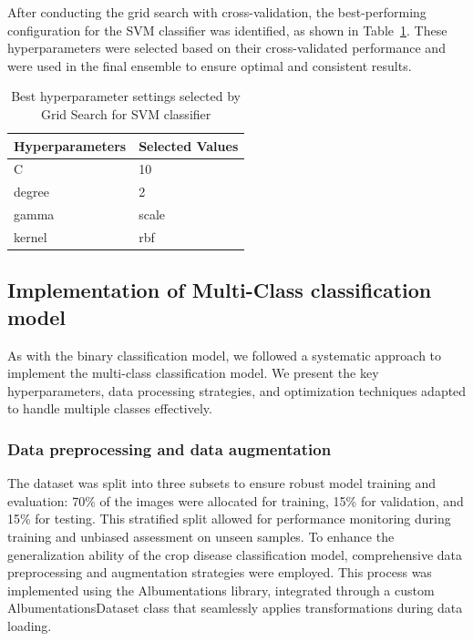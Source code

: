 After conducting the grid search with cross-validation, the best-performing configuration for the SVM classifier was identified, as shown in Table~\ref{tab:svm_best}. These hyperparameters were selected based on their cross-validated performance and were used in the final ensemble to ensure optimal and consistent results.

\begin{table}[h]
\centering
\caption{Best hyperparameter settings selected by Grid Search for SVM classifier}
\begin{tabular}{|p{4.5cm}|p{8.5cm}|}
\hline
\textbf{Hyperparameters} & \textbf{Selected Values} \\
\hline
C & 10 \\
\hline
degree & 2 \\
\hline
gamma & scale \\
\hline
kernel & rbf \\
\hline
\end{tabular}
\label{tab:svm_best}
\end{table}




\subsection{Implementation of Multi-Class classification model}
As with the binary classification model, we followed a systematic approach to implement the multi-class classification model. We present the key hyperparameters, data processing strategies, and optimization techniques adapted to handle multiple classes effectively.
\subsubsection{Data preprocessing and data augmentation}
\label{sec:data_augmentation}
The dataset was split into three subsets to ensure robust model training and evaluation: 70\% of the images were allocated for training, 15\% for validation, and 15\% for testing. This stratified split allowed for performance monitoring during training and unbiased assessment on unseen samples.
To enhance the generalization ability of the crop disease classification model, comprehensive data preprocessing and augmentation strategies were employed. This process was implemented using the Albumentations library, integrated through a custom AlbumentationsDataset class that seamlessly applies transformations during data loading. 

